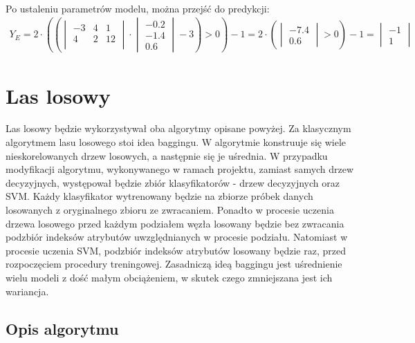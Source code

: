 \documentclass[
    left=2.5cm,         %
    right=2.5cm,        %
    top=2.5cm,          %
    bottom=3cm,         %
    bindingoffset=6mm,  %
    nohyphenation=false %
]{eiti/eiti-report}
\begin{document}
\\
    Po ustaleniu parametrów modelu, można przejść do predykcji:
\begin{gather*}
    Y_E = 2\cdot (
            (\begin{vmatrix}
                -3&4&1\\
                4&2&12\\
            \end{vmatrix}
            \cdot 
            \begin{vmatrix}
                -0.2\\
                -1.4\\
                0.6
            \end{vmatrix} 
            - 3
            ) 
        > 0) -1 = 
        2 \cdot (
        \begin{vmatrix}
                -7.4\\
                0.6
        \end{vmatrix} 
        > 0) - 1 = 
        \begin{vmatrix}
                -1\\
                1
        \end{vmatrix} 
\end{gather*}

\section{Las losowy}
Las losowy będzie wykorzystywał oba algorytmy opisane powyżej. Za klasycznym algorytmem lasu losowego stoi idea baggingu. W algorytmie konstruuje się wiele nieskorelowanych drzew losowych, a następnie się je uśrednia. W przypadku modyfikacji algorytmu, wykonywanego w ramach projektu, zamiast samych drzew decyzyjnych, występował będzie zbiór klasyfikatorów - drzew decyzyjnych oraz SVM. Każdy klasyfikator wytrenowany będzie na zbiorze próbek danych losowanych z oryginalnego zbioru ze zwracaniem. Ponadto w procesie uczenia drzewa losowego przed każdym podziałem węzła losowany będzie bez zwracania podzbiór indeksów atrybutów uwzględnianych w procesie podziału. Natomiast w procesie uczenia SVM, podzbiór indeksów atrybutów losowany będzie raz, przed rozpoczęciem procedury treningowej. Zasadniczą ideą baggingu jest uśrednienie wielu modeli z dość małym obciążeniem, w skutek czego zmniejszana jest ich wariancja.

\subsection{Opis algorytmu}
\end{document}
